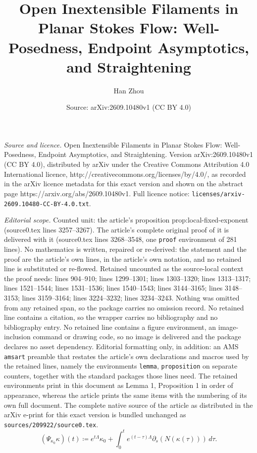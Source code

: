 \documentclass[10pt,a4paper]{amsart}
\title{Open Inextensible Filaments in Planar Stokes Flow: Well-Posedness, Endpoint Asymptotics, and Straightening}
\author{Han Zhou}
\date{Source: arXiv:2609.10480v1 (CC BY 4.0)}
\newcommand{\p}{\partial}
\newcommand{\paren}[1]{\left(#1\right)}
\begin{document}
\maketitle

\noindent\emph{Source and licence.} Open Inextensible Filaments in Planar Stokes Flow: Well-Posedness, Endpoint Asymptotics, and Straightening. Version arXiv:2609.10480v1 (CC BY 4.0), distributed by arXiv under the Creative Commons Attribution 4.0 International licence, http://creativecommons.org/licenses/by/4.0/, as recorded in the arXiv licence metadata for this exact version and shown on the abstract page https://arxiv.org/abs/2609.10480v1. Full licence notice: \texttt{licenses/arxiv-2609.10480-CC-BY-4.0.txt}.\par\smallskip

\noindent\textit{Editorial scope.} Counted unit: the article's proposition prop:local-fixed-exponent (source0.tex lines 3257--3267). The article's complete original proof of it is delivered with it (source0.tex lines 3268--3548, one \texttt{proof} environment of 281 lines). No mathematics is written, repaired or re-derived: the statement and the proof are the article's own lines, in the article's own notation, and no retained line is substituted or re-flowed.  Retained uncounted as the source-local context the proof needs: lines 904--910; lines 1299--1301; lines 1303--1320; lines 1313--1317; lines 1521--1544; lines 1531--1536; lines 1540--1543; lines 3144--3165; lines 3148--3153; lines 3159--3164; lines 3224--3232; lines 3234--3243.  Nothing was omitted from any retained span, so the package carries no omission record.  No retained line contains a citation, so the wrapper carries no bibliography and no bibliography entry.  No retained line contains a figure environment, an image-inclusion command or drawing code, so no image is delivered and the package declares no asset dependency.  Editorial formatting only, in addition: an AMS \texttt{amsart} preamble that restates the article's own declarations and macros used by the retained lines, namely the environments \texttt{lemma}, \texttt{proposition} on separate counters, together with the standard packages those lines need.  The retained environments print in this document as Lemma 1, Proposition 1 in order of appearance, whereas the article prints the same items with the numbering of its own full document.  The complete native source of the article as distributed in the arXiv e-print for this exact version is bundled unchanged as \texttt{sources/209922/source0.tex}.
\begin{equation}\label{eqn:mild-def}
    (\Psi_{\kappa_0}\kappa)(t)
    \coloneqq
    e^{t\Lambda}\kappa_0
    +\int_0^t e^{(t-\tau)\Lambda}
    \p_s\paren{N(\kappa(\tau))}\,d\tau.
\end{equation}
\end{document}
